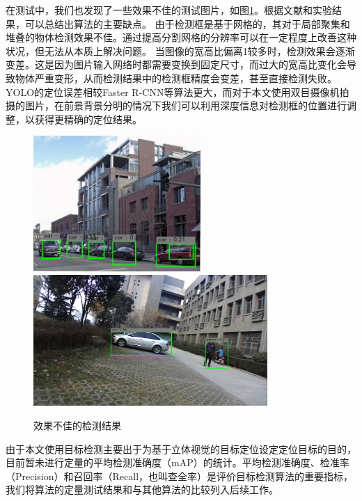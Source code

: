 在测试中，我们也发现了一些效果不佳的测试图片，如图\ref{fig:3_3_反面结果}。根据文献和实验结果，可以总结出算法的主要缺点。
由于检测框是基于网格的，其对于局部聚集和堆叠的物体检测效果不佳。通过提高分割网格的分辨率可以在一定程度上改善这种状况，但无法从本质上解决问题。
当图像的宽高比偏离1较多时，检测效果会逐渐变差。这是因为图片输入网络时都需要变换到固定尺寸，而过大的宽高比变化会导致物体严重变形，从而检测结果中的检测框精度会变差，甚至直接检测失败。
YOLO的定位误差相较Faster R-CNN等算法更大，而对于本文使用双目摄像机拍摄的图片，在前景背景分明的情况下我们可以利用深度信息对检测框的位置进行调整，以获得更精确的定位结果。
\begin{figure}[htbp] %
	\centering
	\includegraphics[width=2.5in]{figures/3_3_反面结果1} %
	\includegraphics[width=3.5in]{figures/3_3_反面结果2}
	\caption{效果不佳的检测结果}\label{fig:3_3_反面结果}
\end{figure}


由于本文使用目标检测主要出于为基于立体视觉的目标定位设定定位目标的目的，目前暂未进行定量的平均检测准确度（mAP）的统计。平均检测准确度、检准率（Precision）和召回率（Recall，也叫查全率）是评价目标检测算法的重要指标，我们将算法的定量测试结果和与其他算法的比较列入后续工作。


